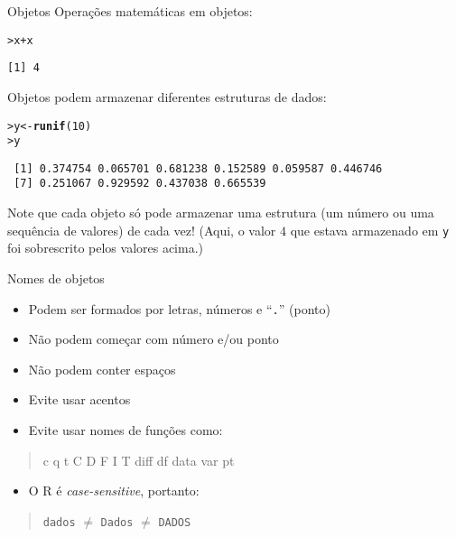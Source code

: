 \documentclass[10pt,handout]{beamer}\usepackage{graphicx, color}
\makeatletter
\newcommand{\hlfunctioncall}[1]{\textcolor[rgb]{0,0,0.545098039215686}{\textbf{#1}}}%
\newenvironment{kframe}{%
 \def\at@end@of@kframe{}%
 \ifinner\ifhmode%
  \def\at@end@of@kframe{\end{minipage}}%
  \begin{minipage}{\columnwidth}%
 \fi\fi%
 \def\FrameCommand##1{\hskip\@totalleftmargin \hskip-\fboxsep
 \colorbox{shadecolor}{##1}\hskip-\fboxsep
     \hskip-\linewidth \hskip-\@totalleftmargin \hskip\columnwidth}%
 \MakeFramed {\advance\hsize-\width
   \@totalleftmargin\z@ \linewidth\hsize
   \@setminipage}}%
 {\par\unskip\endMakeFramed%
 \at@end@of@kframe}
\newenvironment{knitrout}{}{} %
\makeatother
\begin{document}
\begin{frame}[fragile=singleslide]{Objetos}
Operações matemáticas em objetos:
\begin{knitrout}\small
{}\color{fgcolor}\begin{kframe}
\begin{alltt}
> x + x
\end{alltt}
\begin{verbatim}
[1] 4
\end{verbatim}
\end{kframe}
\end{knitrout}

Objetos podem armazenar diferentes estruturas de dados:
\begin{knitrout}\small
{}\color{fgcolor}\begin{kframe}
\begin{alltt}
> y <- \hlfunctioncall{runif}(10)
> y
\end{alltt}
\begin{verbatim}
 [1] 0.374754 0.065701 0.681238 0.152589 0.059587 0.446746
 [7] 0.251067 0.929592 0.437038 0.665539
\end{verbatim}
\end{kframe}
\end{knitrout}

Note que cada objeto só pode armazenar uma estrutura (um número ou uma
sequência de valores) de cada vez! (Aqui, o valor $4$ que estava
armazenado em \verb|y| foi sobrescrito pelos valores acima.)
\end{frame}

\begin{frame}[fragile=singleslide]{Nomes de objetos}
\begin{itemize}
\item Podem ser formados por letras, números e ``\texttt{.}'' (ponto)
\item Não podem começar com número e/ou ponto
\item Não podem conter espaços
\item Evite usar acentos
\item Evite usar nomes de funções como:
\end{itemize}
\begin{quote}
\begin{center}
\ttfamily \upshape
c q t C D F I T diff df data var pt
\end{center}
\end{quote}
\begin{itemize}
\item O R é \emph{case-sensitive}, portanto:
\end{itemize}
\begin{quote}
\begin{center}
\ttfamily \upshape
\texttt{dados} $\neq$ \texttt{Dados} $\neq$ \texttt{DADOS}
\end{center}
\end{quote}
\end{frame}
\end{document}
